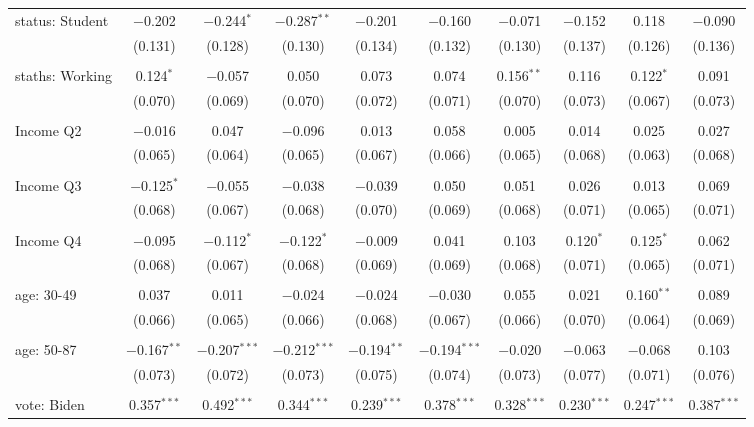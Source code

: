 \begin{tabular}{@{\extracolsep{5pt}}lccccccccc}
 status: Student & $-$0.202 & $-$0.244$^{*}$ & $-$0.287$^{**}$ & $-$0.201 & $-$0.160 & $-$0.071 & $-$0.152 & 0.118 & $-$0.090 \\ 
  & (0.131) & (0.128) & (0.130) & (0.134) & (0.132) & (0.130) & (0.137) & (0.126) & (0.136) \\ 
  & & & & & & & & & \\ 
 staths: Working & 0.124$^{*}$ & $-$0.057 & 0.050 & 0.073 & 0.074 & 0.156$^{**}$ & 0.116 & 0.122$^{*}$ & 0.091 \\ 
  & (0.070) & (0.069) & (0.070) & (0.072) & (0.071) & (0.070) & (0.073) & (0.067) & (0.073) \\ 
  & & & & & & & & & \\ 
 Income Q2 & $-$0.016 & 0.047 & $-$0.096 & 0.013 & 0.058 & 0.005 & 0.014 & 0.025 & 0.027 \\ 
  & (0.065) & (0.064) & (0.065) & (0.067) & (0.066) & (0.065) & (0.068) & (0.063) & (0.068) \\ 
  & & & & & & & & & \\ 
 Income Q3 & $-$0.125$^{*}$ & $-$0.055 & $-$0.038 & $-$0.039 & 0.050 & 0.051 & 0.026 & 0.013 & 0.069 \\ 
  & (0.068) & (0.067) & (0.068) & (0.070) & (0.069) & (0.068) & (0.071) & (0.065) & (0.071) \\ 
  & & & & & & & & & \\ 
 Income Q4 & $-$0.095 & $-$0.112$^{*}$ & $-$0.122$^{*}$ & $-$0.009 & 0.041 & 0.103 & 0.120$^{*}$ & 0.125$^{*}$ & 0.062 \\ 
  & (0.068) & (0.067) & (0.068) & (0.069) & (0.069) & (0.068) & (0.071) & (0.065) & (0.071) \\ 
  & & & & & & & & & \\ 
 age: 30-49 & 0.037 & 0.011 & $-$0.024 & $-$0.024 & $-$0.030 & 0.055 & 0.021 & 0.160$^{**}$ & 0.089 \\ 
  & (0.066) & (0.065) & (0.066) & (0.068) & (0.067) & (0.066) & (0.070) & (0.064) & (0.069) \\ 
  & & & & & & & & & \\ 
 age: 50-87 & $-$0.167$^{**}$ & $-$0.207$^{***}$ & $-$0.212$^{***}$ & $-$0.194$^{**}$ & $-$0.194$^{***}$ & $-$0.020 & $-$0.063 & $-$0.068 & 0.103 \\ 
  & (0.073) & (0.072) & (0.073) & (0.075) & (0.074) & (0.073) & (0.077) & (0.071) & (0.076) \\ 
  & & & & & & & & & \\ 
 vote: Biden & 0.357$^{***}$ & 0.492$^{***}$ & 0.344$^{***}$ & 0.239$^{***}$ & 0.378$^{***}$ & 0.328$^{***}$ & 0.230$^{***}$ & 0.247$^{***}$ & 0.387$^{***}$ \\ 

\end{tabular}
